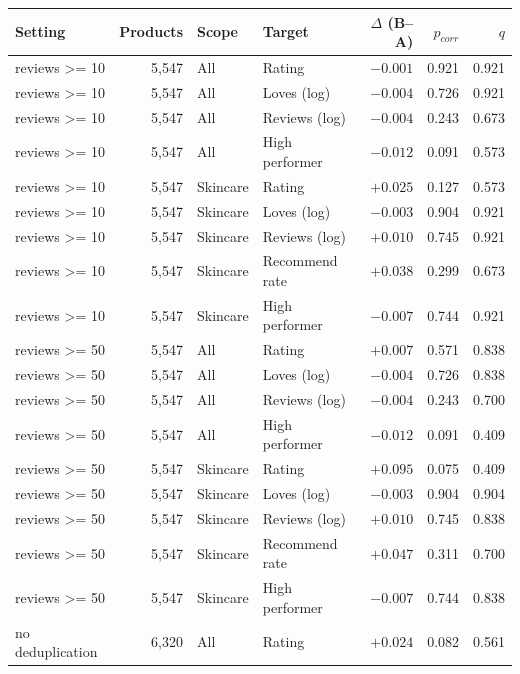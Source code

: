\begin{table}[htbp]
\centering
\small
\begin{tabular}{|l|r|l|l|r|r|r|}
\hline
\rowcolor{headfill} \textbf{Setting} & \textbf{Products} & \textbf{Scope} & \textbf{Target} & \textbf{$\Delta$ (B--A)} & \textbf{$p_{corr}$} & \textbf{$q$} \\
\hline
reviews >= 10 & 5,547 & All & Rating & $-0.001$ & 0.921 & 0.921 \\
\hline
reviews >= 10 & 5,547 & All & Loves (log) & $-0.004$ & 0.726 & 0.921 \\
\hline
reviews >= 10 & 5,547 & All & Reviews (log) & $-0.004$ & 0.243 & 0.673 \\
\hline
reviews >= 10 & 5,547 & All & High performer & $-0.012$ & 0.091 & 0.573 \\
\hline
reviews >= 10 & 5,547 & Skincare & Rating & $+0.025$ & 0.127 & 0.573 \\
\hline
reviews >= 10 & 5,547 & Skincare & Loves (log) & $-0.003$ & 0.904 & 0.921 \\
\hline
reviews >= 10 & 5,547 & Skincare & Reviews (log) & $+0.010$ & 0.745 & 0.921 \\
\hline
reviews >= 10 & 5,547 & Skincare & Recommend rate & $+0.038$ & 0.299 & 0.673 \\
\hline
reviews >= 10 & 5,547 & Skincare & High performer & $-0.007$ & 0.744 & 0.921 \\
\hline
reviews >= 50 & 5,547 & All & Rating & $+0.007$ & 0.571 & 0.838 \\
\hline
reviews >= 50 & 5,547 & All & Loves (log) & $-0.004$ & 0.726 & 0.838 \\
\hline
reviews >= 50 & 5,547 & All & Reviews (log) & $-0.004$ & 0.243 & 0.700 \\
\hline
reviews >= 50 & 5,547 & All & High performer & $-0.012$ & 0.091 & 0.409 \\
\hline
reviews >= 50 & 5,547 & Skincare & Rating & $+0.095$ & 0.075 & 0.409 \\
\hline
reviews >= 50 & 5,547 & Skincare & Loves (log) & $-0.003$ & 0.904 & 0.904 \\
\hline
reviews >= 50 & 5,547 & Skincare & Reviews (log) & $+0.010$ & 0.745 & 0.838 \\
\hline
reviews >= 50 & 5,547 & Skincare & Recommend rate & $+0.047$ & 0.311 & 0.700 \\
\hline
reviews >= 50 & 5,547 & Skincare & High performer & $-0.007$ & 0.744 & 0.838 \\
\hline
no deduplication & 6,320 & All & Rating & $+0.024$ & 0.082 & 0.561 \\

\end{tabular}
\end{table}
